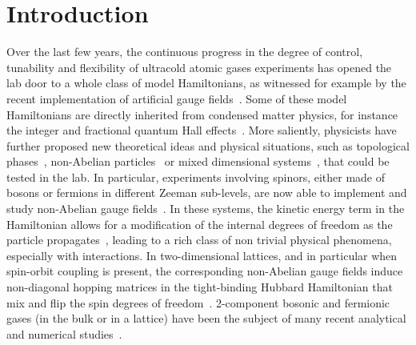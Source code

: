 \documentclass[aps,pra,showpacs,twocolumn,superscriptaddress]{revtex4-1}
\begin{document}
\maketitle

\section{Introduction}


Over the last few years, the continuous progress in the degree of control, tunability and flexibility of 
ultracold atomic gases experiments \cite{Lewenstein07,Blochreview08,Ketterle2} has opened the lab door to 
a whole class of model Hamiltonians, as witnessed for example by the recent implementation of artificial gauge  
fields~\cite{Spielman09a,Spielman09b,Spielman11,Zhang12,Zwierlein12,Windpassinger12,Spielman12}. 
Some of these model Hamiltonians are directly inherited from 
condensed matter physics, for instance the integer and fractional quantum Hall
effects~\cite{FCI13,FCIPRL1,FCIPRL2}. More saliently, physicists have further proposed new theoretical 
ideas and physical situations, such as topological phases~\cite{Mottonen09,Bercioux11,Hueda12,YuXin15,Goldman2016,Zhai2015}, 
non-Abelian particles~\cite{Burrello10} or  
mixed dimensional systems~\cite{Nishida_2008,Nishida_2010,Lamporesi_2010,Huang_2013,Iskin_2010}, that 
could be tested in the lab. 
In particular, experiments involving spinors, either made of bosons or fermions in different Zeeman sub-levels,
are now able to implement and study non-Abelian gauge fields~\cite{Goldman2016,Livi2016,Gross2017,Sugawa2016,Ray2014}. 
In these systems, the kinetic 
energy term in the Hamiltonian  allows for a modification of the internal degrees of freedom as the 
particle propagates~\cite{Dalibard11,Goldman2013},  leading to a rich class of non trivial physical 
phenomena, especially with interactions. 
In two-dimensional lattices, and in particular when spin-orbit coupling is present, the corresponding 
non-Abelian gauge fields induce non-diagonal hopping matrices in the tight-binding Hubbard Hamiltonian 
that mix and flip the spin degrees of freedom~\cite{Dalibard11,Goldman2013}.
2-component bosonic and fermionic gases (in the bulk or in a lattice) have been the subject of many 
recent analytical and numerical 
studies~\cite{Lewenstein09,Cole_2012,Cai12,Galitski12,Hofstetter12,Fujimoto09,Goldman12,Jiri2014,
Shenoy11,Sademelo12,Lewenstein10,Iskin11,Iskin12,Iskin13,Riedl13}. 
\end{document}
